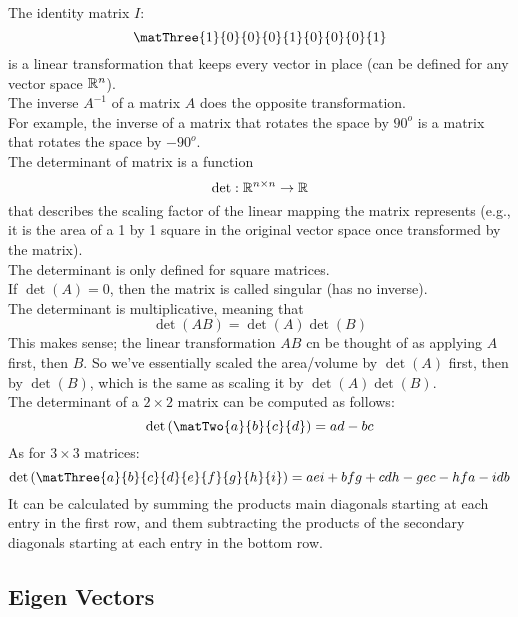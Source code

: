 \documentclass[12pt]{article}
\begin{document}
    The identity matrix $I$:
    \[ \matThree{1}{0}{0}{0}{1}{0}{0}{0}{1} \]
    is a linear transformation that keeps
    every vector in place
    (can be defined for any vector space $\mathbb{R}^n$). \\

    The inverse $A^{-1}$ of a matrix $A$
    does the opposite transformation. \\
    For example, the inverse of
    a matrix that rotates the space by $90^o$
    is a matrix that rotates the space by $-90^o$. \\

    The determinant of matrix is a function
    \[ \det: \mathbb{R}^{n \times n} \to \mathbb{R} \]
    that describes the scaling factor of the
    linear mapping the matrix represents
    (e.g., it is the area of a 1 by 1 square
    in the original vector space once
    transformed by the matrix). \\

    The determinant is only defined for square matrices. \\
    
    If $\det(A) = 0$,
    then the matrix is called singular
    (has no inverse). \\

    The determinant is multiplicative,
    meaning that
    \[ \det(AB) = \det(A)\det(B) \]
    This makes sense;
    the linear transformation $AB$
    cn be thought of as applying $A$
    first, then $B$.
    So we've essentially scaled the area/volume
    by $\det(A)$ first, then by $\det(B)$,
    which is the same as scaling it by $\det(A)\det(B)$. \\

    The determinant of a $2 \times 2$ matrix
    can be computed as follows:
    \[ \det\left( \matTwo{a}{b}{c}{d} \right) 
    = ad - bc \]
    As for $3 \times 3$ matrices:
     \[ \det\left( \matThree{a}{b}{c}{d}{e}{f}{g}{h}{i} \right) 
    = aei + bfg + cdh - gec - hfa - idb \]
    It can be calculated by summing
    the products main diagonals starting at each entry in
    the first row,
    and them subtracting the products
    of the secondary diagonals starting at each
    entry in the bottom row. \\

    \newpage

    \subsection*{Eigen Vectors}
\end{document}
